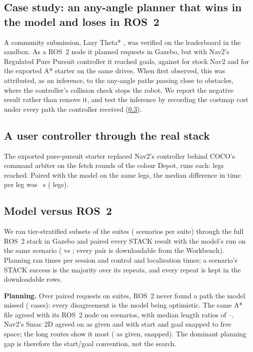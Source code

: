 \subsection{Case study: an any-angle planner that wins in the model and loses in ROS~2}
A community submission, Lazy Theta* \cite{nash2010lazytheta}, was verified on the leaderboard
in the sandbox. As a ROS~2 node it planned \StackThetaPlans{} requests in Gazebo, but with
Nav2's Regulated Pure Pursuit controller \cite{macenski2023rpp} it reached \StackThetaDrives{}
goals, against \StackStockDrives{} for stock Nav2 and \StackAstarDrives{} for the exported A*
starter on the same \StackDriveScenarios{} drives. When first observed, this was attributed, as an
inference, to the any-angle paths passing close to obstacles, where the controller's collision
check stops the robot. We report the negative result rather than remove it, and test the
inference by recording the costmap cost under every path the controller received
(\cref{sec:exp-gap}).

\subsection{A user controller through the real stack}
The exported pure-pursuit starter replaced Nav2's controller behind COCO's command arbiter on
the \StackPPRounds{} fetch rounds of the colour Depot, \StackPPRunsPerRound{} runs each: \StackPPLegs{} legs reached. Paired
with the model on the same legs, the median difference in time per leg was \StackPPGapS{}~s
(\StackPPGapN{} legs).

\subsection{Model versus ROS~2}\label{sec:exp-gap}
We ran tier-stratified subsets of the suites (\GapPlanScenarios{} scenarios per suite) through the
full ROS~2 stack in Gazebo and paired every STACK result with the model's run on the same scenario
( vs ; every pair is downloadable from the Workbench). Planning ran
\GapPlanReps{} times per session and control and localisation \GapCtrlReps{} times; a scenario's STACK
success is the majority over its repeats, and every repeat is kept in the downloadable rows.

\textbf{Planning.} Over \GapPlanPairs{} paired requests on \GapPlanSuites{} suites, ROS~2 never found a
path the model missed (\GapPlanStackOnly{} cases): every disagreement is the model being
optimistic. The same A* file agreed with its ROS~2 node on \GapSameFileAgree{} scenarios, with
median length ratios of \GapSameFileRatioMin{}--\GapSameFileRatioMax{}. Nav2's Smac 2D agreed on
\GapSmacStockAgree{} as given and \GapSmacSnappedAgree{} with start and goal snapped to free
space; the long routes show it most (\GapLongStockBoth{} as given, \GapLongSnappedBoth{} snapped). The
dominant planning gap is therefore the start/goal convention, not the search.

